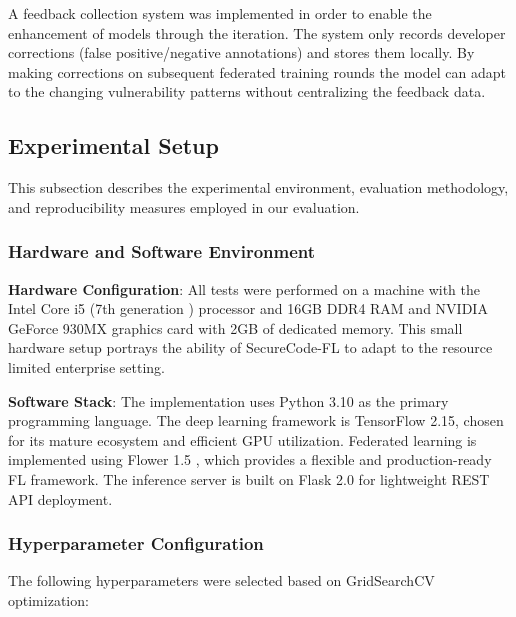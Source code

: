 \documentclass[pdflatex,sn-mathphys-num]{sn-jnl}
\theoremstyle{thmstyleone}%
\theoremstyle{thmstyletwo}%
\theoremstyle{thmstylethree}%
\begin{document}
A feedback collection system was implemented in order to enable the enhancement of models through the iteration. The system only records developer corrections (false positive/negative annotations) and stores them locally. By making corrections on subsequent federated training rounds the model can adapt to the changing vulnerability patterns without centralizing the feedback data.

\subsection{Experimental Setup}\label{subsec:setup}

This subsection describes the experimental environment, evaluation methodology, and reproducibility measures employed in our evaluation.

\subsubsection{Hardware and Software Environment}

\textbf{Hardware Configuration}: All tests were performed on a machine with the Intel Core i5 (7th generation ) processor and 16GB DDR4 RAM and NVIDIA GeForce 930MX graphics card with 2GB of dedicated memory. This small hardware setup portrays the ability of SecureCode-FL to adapt to the resource limited enterprise setting.

\textbf{Software Stack}: The implementation uses Python 3.10 as the primary programming language. The deep learning framework is TensorFlow 2.15, chosen for its mature ecosystem and efficient GPU utilization. Federated learning is implemented using Flower 1.5 \cite{flower2024}, which provides a flexible and production-ready FL framework. The inference server is built on Flask 2.0 for lightweight REST API deployment.

\subsubsection{Hyperparameter Configuration}\label{subsubsec:hyperparams}

The following hyperparameters were selected based on GridSearchCV optimization:
\end{document}
